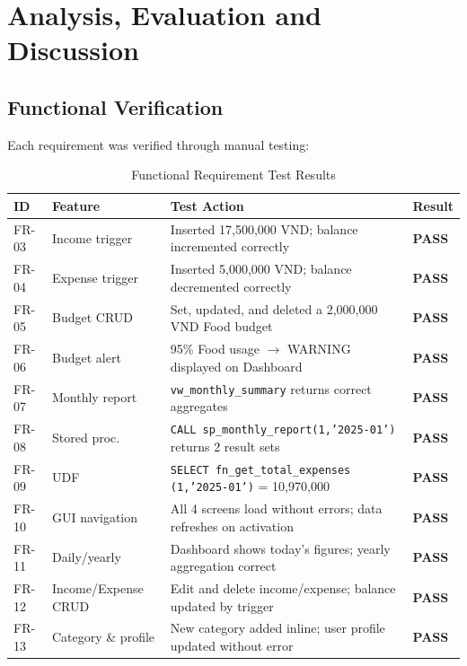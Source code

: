 \documentclass[12pt, a4paper]{article}
\begin{document}
\newpage

\section{Analysis, Evaluation and Discussion}

\subsection{Functional Verification}

Each requirement was verified through manual testing:

\begin{table}[H]
\centering
\caption{Functional Requirement Test Results}
\begin{tabular}{llp{7.5cm}l}
\toprule
\textbf{ID} & \textbf{Feature} & \textbf{Test Action} & \textbf{Result} \\
\midrule
FR-03 & Income trigger    & Inserted 17,500,000 VND; balance incremented correctly
  & \textcolor{codegreen}{\textbf{PASS}} \\
FR-04 & Expense trigger   & Inserted 5,000,000 VND; balance decremented correctly
  & \textcolor{codegreen}{\textbf{PASS}} \\
FR-05 & Budget CRUD       & Set, updated, and deleted a 2,000,000 VND Food budget
  & \textcolor{codegreen}{\textbf{PASS}} \\
FR-06 & Budget alert      & 95\% Food usage $\to$ WARNING displayed on Dashboard
  & \textcolor{codegreen}{\textbf{PASS}} \\
FR-07 & Monthly report    & \texttt{vw\_monthly\_summary} returns correct aggregates
  & \textcolor{codegreen}{\textbf{PASS}} \\
FR-08 & Stored proc.      & \texttt{CALL sp\_monthly\_report(1,'2025-01')} returns 2 result sets
  & \textcolor{codegreen}{\textbf{PASS}} \\
FR-09 & UDF               & \texttt{SELECT fn\_get\_total\_expenses (1,'2025-01')} = 10,970,000
  & \textcolor{codegreen}{\textbf{PASS}} \\
FR-10 & GUI navigation    & All 4 screens load without errors; data refreshes on activation
  & \textcolor{codegreen}{\textbf{PASS}} \\
FR-11 & Daily/yearly      & Dashboard shows today's figures; yearly aggregation correct
  & \textcolor{codegreen}{\textbf{PASS}} \\
FR-12 & Income/Expense CRUD & Edit and delete income/expense; balance updated by trigger
  & \textcolor{codegreen}{\textbf{PASS}} \\
FR-13 & Category \& profile & New category added inline; user profile updated without error
  & \textcolor{codegreen}{\textbf{PASS}} \\
\bottomrule
\end{tabular}
\end{table}
\end{document}
